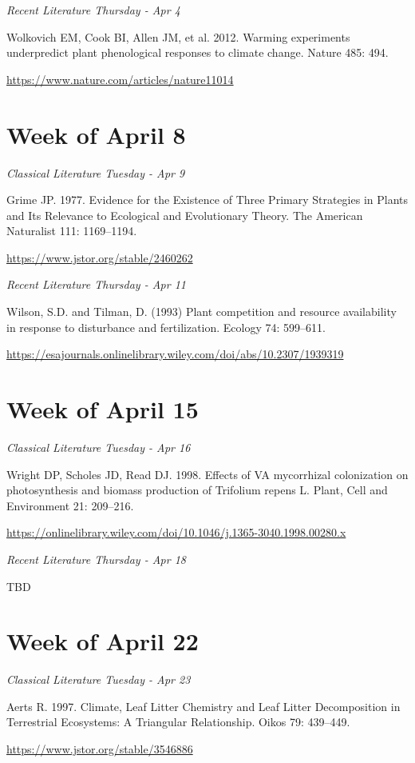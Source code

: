 \documentclass[12pt, notitlepage]{article}   	%
\begin{document}
{\textit{Recent Literature Thursday - Apr 4} \par
Wolkovich EM, Cook BI, Allen JM, et al. 2012. 
Warming experiments underpredict plant phenological responses to climate change. 
Nature 485: 494. \par
\url{https://www.nature.com/articles/nature11014}

\section*{Week of April 8}
\textit{Classical Literature Tuesday - Apr 9} \par
Grime JP. 1977. Evidence for the Existence of Three Primary Strategies in Plants and Its 
Relevance to Ecological and Evolutionary Theory. 
The American Naturalist 111: 1169–1194. \par
\url{https://www.jstor.org/stable/2460262}

\textit{Recent Literature Thursday - Apr 11} \par
Wilson, S.D. and Tilman, D. (1993) Plant competition and resource availability in 
response to disturbance and fertilization. Ecology 74: 599–611. \par
\url{https://esajournals.onlinelibrary.wiley.com/doi/abs/10.2307/1939319}

\section*{Week of April 15}
\textit{Classical Literature Tuesday - Apr 16} \par
Wright DP, Scholes JD, Read DJ. 1998. Effects of VA mycorrhizal colonization on 
photosynthesis and biomass production of Trifolium repens L. 
Plant, Cell and Environment 21: 209–216. \par
\url{https://onlinelibrary.wiley.com/doi/10.1046/j.1365-3040.1998.00280.x}

\textit{Recent Literature Thursday - Apr 18} \par
TBD \par

\section*{Week of April 22}
\textit{Classical Literature Tuesday - Apr 23} \par
Aerts R. 1997. Climate, Leaf Litter Chemistry and Leaf Litter Decomposition in 
Terrestrial Ecosystems: A Triangular Relationship. Oikos 79: 439–449. \par
\url{https://www.jstor.org/stable/3546886}

}
\end{document}
